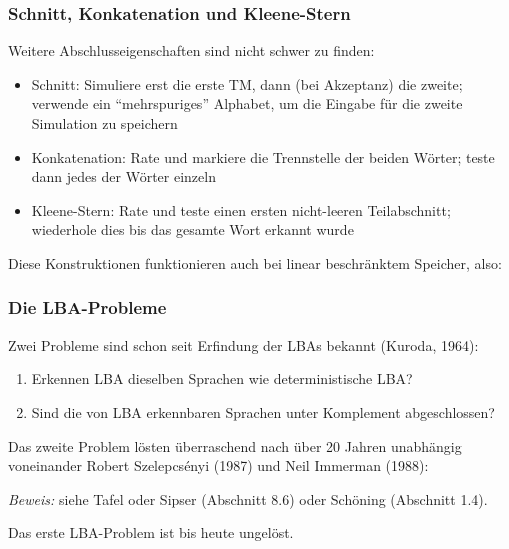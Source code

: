 \documentclass[onlymath]{beamer}
\begin{document}
\begin{frame}\frametitle{Schnitt, Konkatenation und Kleene-Stern}

Weitere Abschlusseigenschaften sind nicht schwer zu finden:

\begin{itemize}
\item \alert{Schnitt:} Simuliere erst die erste TM, dann (bei Akzeptanz) die zweite; verwende ein "`mehrspuriges"' Alphabet, um die Eingabe für die zweite Simulation zu speichern
\item \alert{Konkatenation:} Rate und markiere die Trennstelle der beiden Wörter; teste dann jedes der Wörter einzeln
\item \alert{Kleene-Stern:} Rate und teste einen ersten nicht-leeren Teilabschnitt; wiederhole dies bis das gesamte Wort erkannt wurde
\end{itemize}\pause

Diese Konstruktionen funktionieren auch bei linear beschränktem Speicher, also:\medskip


\end{frame}

\begin{frame}\frametitle{Die LBA-Probleme}

Zwei Probleme sind schon seit Erfindung der LBAs bekannt (Kuroda, 1964):
\begin{enumerate}[(1)]
\item Erkennen LBA dieselben Sprachen wie deterministische LBA?
\item Sind die von LBA erkennbaren Sprachen unter Komplement abgeschlossen?
\end{enumerate}\pause

Das zweite Problem lösten überraschend nach über 20 Jahren unabhängig voneinander Robert Szelepcsényi (1987) und Neil Immerman (1988):\medskip

\medskip

\emph{Beweis:} siehe Tafel oder Sipser (Abschnitt 8.6) oder Schöning (Abschnitt 1.4).
\medskip\pause

Das erste LBA-Problem ist bis heute ungelöst.

\end{frame}
\end{document}
